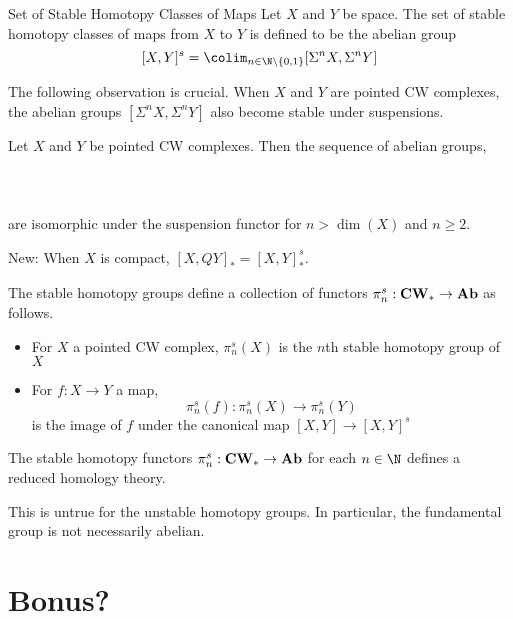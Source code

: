 \documentclass[a4paper]{article}
\begin{document}
\begin{defn}{Set of Stable Homotopy Classes of Maps}{} Let $X$ and $Y$ be space. The set of stable homotopy classes of maps from $X$ to $Y$ is defined to be the abelian group $$[X,Y]^s=\colim_{n\in\N\setminus\{0,1\}}[\Sigma^nX,\Sigma^nY]$$
\end{defn}

The following observation is crucial. When $X$ and $Y$ are pointed CW complexes, the abelian groups $[\Sigma^n X,\Sigma^n Y]$ also become stable under suspensions. 

\begin{thm}{}{} Let $X$ and $Y$ be pointed CW complexes. Then the sequence of abelian groups, \\~\\
\\~\\
are isomorphic under the suspension functor for $n>\dim(X)$ and $n\geq 2$. 
\end{thm}

New: When $X$ is compact, $[X,QY]_\ast=[X,Y]_\ast^s$. 

\begin{thm}{}{} The stable homotopy groups define a collection of functors $\pi_n^s:\bold{CW}_\ast\to\bold{Ab}$ as follows. 
\begin{itemize}
\item For $X$ a pointed CW complex, $\pi_n^s(X)$ is the $n$th stable homotopy group of $X$
\item For $f:X\to Y$ a map, $$\pi_n^s(f):\pi_n^s(X)\to\pi_n^s(Y)$$ is the image of $f$ under the canonical map $[X,Y]\to[X,Y]^s$
\end{itemize}
\end{thm}

\begin{thm}{}{} The stable homotopy functors $\pi_n^s:\bold{CW}_\ast\to\bold{Ab}$ for each $n\in\N$ defines a reduced homology theory. 
\end{thm}

This is untrue for the unstable homotopy groups. In particular, the fundamental group is not necessarily abelian. 

\pagebreak
\section{Bonus?}
\end{document}
